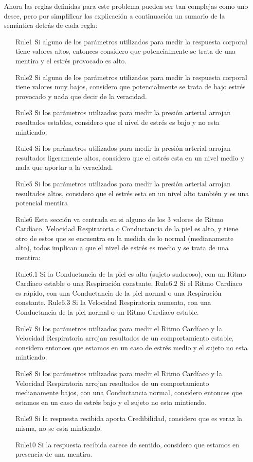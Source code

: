 \documentclass[a4paper,10pt,twocolumn]{article}
\begin{document}
  Ahora las reglas definidas para este problema pueden ser tan complejas como uno desee, pero por simplificar las explicaci\'on a continuaci\'on un sumario de la sem\'antica detr\'as de cada regla:
  \begin{itemize}
  	\item[Rule1] Si alguno de los par\'ametros utilizados para medir la respuesta corporal tiene valores altos, entonces considero que potencialmente se trata de una mentira y el estr\'es provocado es alto.
  	\item[Rule2] Si alguno de los par\'ametros utilizados para medir la respuesta corporal tiene valores muy bajos, considero que potencialmente se trata de bajo estr\'es provocado y nada que decir de la veracidad.
  	\item[Rule3] Si los par\'ametros utilizados para medir la presi\'on arterial arrojan resultados estables, considero que el nivel de estr\'es es bajo y no esta mintiendo.
  	\item[Rule4] Si los par\'ametros utilizados para medir la presi\'on arterial arrojan resultados ligeramente altos, considero que el estr\'es esta en un nivel medio y nada que aportar a la veracidad.
  	\item[Rule5] Si los par\'ametros utilizados para medir la presi\'on arterial arrojan resultados altos, considero que el estr\'es esta en un nivel alto tambi\'en y es una potencial mentira
  	\item[Rule6] Esta secci\'on va centrada en si alguno de los 3 valores de Ritmo Card\'iaco, Velocidad Respiratoria o Conductancia de la piel es alto, y tiene otro de estos que se encuentra en la medida de lo normal (medianamente alto), todos implican a que el nivel de estr\'es es medio y se trata de una mentira:
  	
  		\subitem Rule6.1 Si la Conductancia de la piel es alta (sujeto sudoroso), con un Ritmo Card\'iaco estable o una Respiraci\'on constante.
  		\subitem Rule6.2 Si el Ritmo Card\'iaco es r\'apido, con una Conductancia de la piel normal o una Respiraci\'on constante.
  		\subitem Rule6.3 Si la Velocidad Respiratoria aumenta, con una Conductancia de la piel normal o un Ritmo Card\'iaco estable.
  	\item[Rule7] Si los par\'ametros utilizados para medir el Ritmo Card\'iaco y la Velocidad Respiratoria arrojan resultados de un comportamiento estable, considero entonces que estamos en un caso de estr\'es medio y el sujeto no esta mintiendo.
  	\item[Rule8] Si los par\'ametros utilizados para medir el Ritmo Card\'iaco y la Velocidad Respiratoria arrojan resultados de un comportamiento medianamente bajos, con una Conductancia normal, considero entonces que estamos en un caso de estr\'es bajo y el sujeto no esta mintiendo.
  	\item[Rule9] Si la respuesta recibida aporta Credibilidad, considero que es veraz la misma, no se esta mintiendo.
  	\item[Rule10] Si la respuesta recibida carece de sentido, considero que estamos en presencia de una mentira.
  \end{itemize}
  
\end{document}
